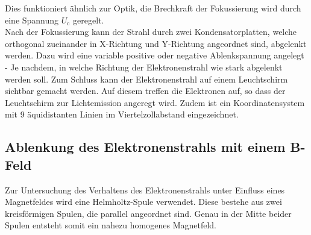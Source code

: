 Dies funktioniert ähnlich zur Optik, die Brechkraft der Fokussierung wird durch eine Spannung $U_\text{c}$ geregelt.\\
Nach der Fokussierung kann der Strahl durch zwei Kondensatorplatten, welche orthogonal zueinander in X-Richtung und Y-Richtung angeordnet sind, abgelenkt werden.
Dazu wird eine variable positive oder negative Ablenkspannung angelegt - Je nachdem, in welche Richtung der Elektronenstrahl wie stark abgelenkt werden soll.
Zum Schluss kann der Elektronenstrahl auf einem Leuchtschirm sichtbar gemacht werden.
Auf diesem treffen die Elektronen auf, so dass der Leuchtschirm zur Lichtemission angeregt wird.
Zudem ist ein Koordinatensystem mit 9 äquidistanten Linien im Viertelzollabstand eingezeichnet.

\subsection{Ablenkung des Elektronenstrahls mit einem B-Feld}
Zur Untersuchung des Verhaltens des Elektronenstrahls unter Einfluss eines Magnetfeldes wird eine Helmholtz-Spule verwendet.
Diese bestehe aus zwei kreisförmigen Spulen, die parallel angeordnet sind.
Genau in der Mitte beider Spulen entsteht somit ein nahezu homogenes Magnetfeld.
